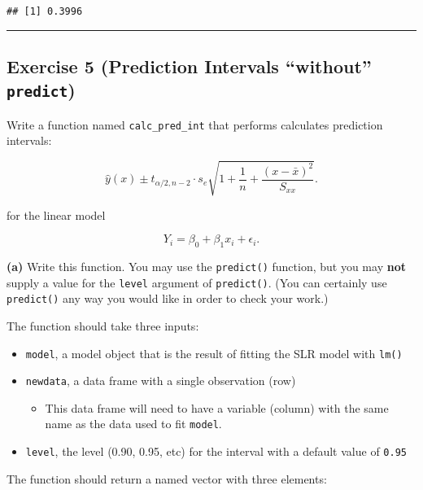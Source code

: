 \documentclass[
]{article}
\providecommand{\tightlist}{%
  \setlength{\itemsep}{0pt}\setlength{\parskip}{0pt}}
\begin{document}
\begin{verbatim}
## [1] 0.3996
\end{verbatim}

\begin{center}\rule{0.5\linewidth}{0.5pt}\end{center}

\hypertarget{exercise-5-prediction-intervals-without-predict}{%
\subsection{\texorpdfstring{Exercise 5 (Prediction Intervals ``without''
\texttt{predict})}{Exercise 5 (Prediction Intervals ``without'' predict)}}\label{exercise-5-prediction-intervals-without-predict}}

Write a function named \texttt{calc\_pred\_int} that performs calculates
prediction intervals:

\[
\hat{y}(x) \pm t_{\alpha/2, n - 2} \cdot s_e\sqrt{1 + \frac{1}{n}+\frac{(x-\bar{x})^2}{S_{xx}}}.
\]

for the linear model

\[
Y_i = \beta_0 + \beta_1 x_i + \epsilon_i.
\]

\textbf{(a)} Write this function. You may use the \texttt{predict()}
function, but you may \textbf{not} supply a value for the \texttt{level}
argument of \texttt{predict()}. (You can certainly use
\texttt{predict()} any way you would like in order to check your work.)

The function should take three inputs:

\begin{itemize}
\tightlist
\item
  \texttt{model}, a model object that is the result of fitting the SLR
  model with \texttt{lm()}
\item
  \texttt{newdata}, a data frame with a single observation (row)

  \begin{itemize}
  \tightlist
  \item
    This data frame will need to have a variable (column) with the same
    name as the data used to fit \texttt{model}.
  \end{itemize}
\item
  \texttt{level}, the level (0.90, 0.95, etc) for the interval with a
  default value of \texttt{0.95}
\end{itemize}

The function should return a named vector with three elements:
\end{document}
